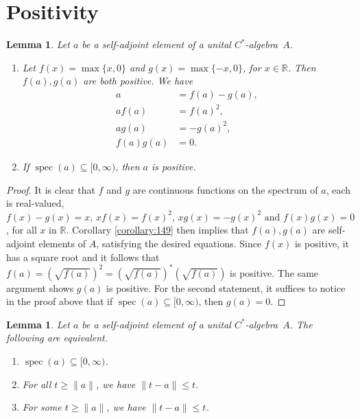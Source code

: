 \documentclass{book}
\newtheorem{lemma}[definition]{Lemma}
\def\cstar{\(C^*\)-algebra}
\begin{document}
\section{Positivity}
\begin{lemma}\label{lemma:161}
  Let \(a\) be a self-adjoint element of a unital \cstar\ \(A\).
  \begin{enumerate}
    \item  Let \(f(x) = \max{\{x,0\}}\) and \(g(x) = \max{\{-x,0\}}\), for \(x \in \mathbb{R}\). Then
    \(f(a),g(a)\) are both positive. We have
    \begin{align*}
      a &= f(a)-g(a),\\
      af(a) &= f(a)^2,\\
      ag(a) &= -g(a)^2,\\
      f(a)g(a) &= 0.
    \end{align*}
    \item If \(\operatorname{spec}(a) \subseteq [0,\infty)\), then \(a\) is positive.
  \end{enumerate}
\end{lemma}
\begin{proof}
  It is clear that \(f\) and \(g\) are continuous functions on the spectrum of
  \(a\), each is real-valued, 
  \(f(x) - g(x) = x\mbox{, }xf(x) = {f(x)}^2\mbox{, }xg(x) = -{g(x)}^2\mbox{ and }f(x)g(x) = 0\), 
  for all \(x\) in \(\mathbb{R}\). Corollary \ref{corollary:149} then implies that \(f(a),g(a)\)
  are self-adjoint elements of \(A\), satisfying the desired equations. Since \(f(x)\)
  is positive, it has a square root and it follows that \(f(a) = {(\sqrt{f(a)})}^2 =
  {(\sqrt{f(a)})}^*(\sqrt{f(a)})\) is positive. The same argument shows \(g(a)\) is positive.
  For the second statement, it suffices to notice in the proof above that if
  \(\operatorname{spec}(a) \subseteq [0,\infty)\), then \(g(a) = 0\).
\end{proof}
\begin{lemma}\label{lemma:162}
  Let \(a\) be a self-adjoint element of a unital \cstar\ \(A\). The
  following are equivalent.
  \begin{enumerate}
    \item \(\operatorname{spec}(a) \subseteq [0,\infty)\).
    \item For all \(t \geq \|a\|\), we have \(\|t-a\| \leq t\).
    \item For some \(t \geq \|a\|\), we have \(\|t-a\| \leq t\).
  \end{enumerate}
\end{lemma}
\end{document}
